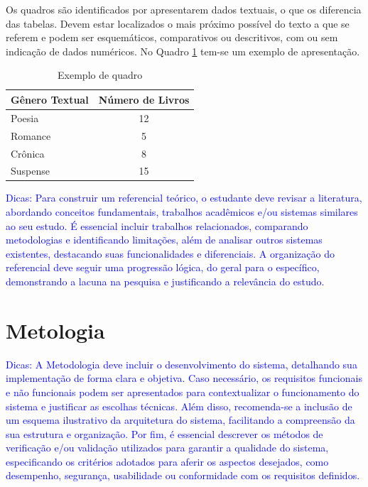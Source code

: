 \documentclass[
	article,			%
	11pt,				%
	oneside,			%
	a4paper,			%
	english,			%
	brazil,				%
	sumario=tradicional
]{abntex2}
\begin{document}
Os quadros são identificados por apresentarem dados textuais, o que os
diferencia das tabelas. Devem estar localizados o mais próximo possível do texto
a que se referem e podem ser esquemáticos, comparativos ou descritivos, com ou
sem indicação de dados numéricos. No Quadro \ref{quad:quadro} tem-se um exemplo de apresentação.

\begin{table}[h]
    \centering
    \caption{Exemplo de quadro}
    \label{quad:quadro}
    \renewcommand{\arraystretch}{1.3} %
    \setlength{\tabcolsep}{12pt} %
    \begin{tabular}{|l|c|}
        \hline
        \textbf{Gênero Textual} & \textbf{Número de Livros} \\
        \hline
        Poesia   & 12 \\
        \hline
        Romance  & 5  \\
        \hline
        Crônica  & 8  \\
        \hline
        Suspense & 15 \\
        \hline
    \end{tabular}
\end{table}

\textcolor{blue}{
Dicas: Para construir um referencial teórico, o estudante deve revisar a
literatura, abordando conceitos fundamentais, trabalhos acadêmicos e/ou sistemas
similares ao seu estudo. É essencial incluir trabalhos relacionados, comparando
metodologias e identificando limitações, além de analisar outros sistemas
existentes, destacando suas funcionalidades e diferenciais. A organização do
referencial deve seguir uma progressão lógica, do geral para o específico,
demonstrando a lacuna na pesquisa e  justificando a relevância do estudo.
}

\section{Metologia}

\textcolor{blue}{
Dicas: A Metodologia deve incluir o desenvolvimento do sistema, detalhando sua
implementação de forma clara e objetiva. Caso necessário, os requisitos
funcionais e não funcionais podem ser apresentados para contextualizar o
funcionamento do sistema e justificar as escolhas técnicas. Além disso,
recomenda-se a inclusão de um esquema ilustrativo da arquitetura do sistema,
facilitando a compreensão da sua estrutura e organização. Por fim, é essencial
descrever os métodos de verificação e/ou validação utilizados para garantir a
qualidade do sistema, especificando os critérios adotados para aferir os
aspectos desejados, como desempenho, segurança, usabilidade ou conformidade com
os requisitos definidos.
}
\end{document}
